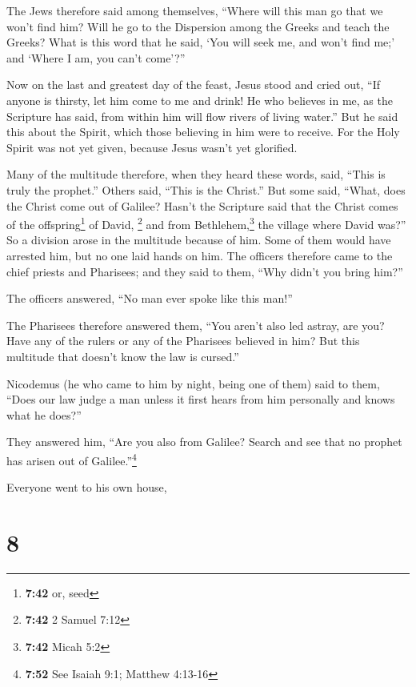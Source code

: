 The Jews therefore said among themselves, ``Where will
this man go that we won't find him? Will he go to the Dispersion among
the Greeks and teach the Greeks?  What is this word that
he said, `You will seek me, and won't find me;' and `Where I am, you
can't come'?''

 Now on the last and greatest day of the feast, Jesus
stood and cried out, ``If anyone is thirsty, let him come to me and
drink!  He who believes in me, as the Scripture has said,
from within him will flow rivers of living water.''  But
he said this about the Spirit, which those believing in him were to
receive. For the Holy Spirit was not yet given, because Jesus wasn't yet
glorified.

 Many of the multitude therefore, when they heard these
words, said, ``This is truly the prophet.''  Others said,
``This is the Christ.'' But some said, ``What, does the Christ come out
of Galilee?  Hasn't the Scripture said that the Christ
comes of the offspring\footnote{\textbf{7:42} or, seed} of David,
\footnote{\textbf{7:42} 2 Samuel 7:12} and from Bethlehem,\footnote{\textbf{7:42}
  Micah 5:2} the village where David was?''  So a
division arose in the multitude because of him.  Some of
them would have arrested him, but no one laid hands on him.
 The officers therefore came to the chief priests and
Pharisees; and they said to them, ``Why didn't you bring him?''

 The officers answered, ``No man ever spoke like this
man!''

 The Pharisees therefore answered them, ``You aren't also
led astray, are you?  Have any of the rulers or any of
the Pharisees believed in him?  But this multitude that
doesn't know the law is cursed.''

 Nicodemus (he who came to him by night, being one of
them) said to them,  ``Does our law judge a man unless it
first hears from him personally and knows what he does?''

 They answered him, ``Are you also from Galilee? Search
and see that no prophet has arisen out of Galilee.''\footnote{\textbf{7:52}
  See Isaiah 9:1; Matthew 4:13-16}

 Everyone went to his own house,

\hypertarget{section-7}{%
\section{8}\label{section-7}}


